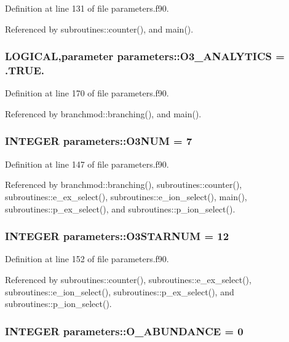Definition at line 131 of file parameters.f90.

Referenced by subroutines::counter(), and main().\hypertarget{namespaceparameters_aba22684f89f881fe4dc9d78bd30d6f5b}{
\subsubsection[{O3\_\-ANALYTICS}]{\setlength{\rightskip}{0pt plus 5cm}LOGICAL,parameter {\bf parameters::O3\_\-ANALYTICS} = .TRUE.}}
\label{namespaceparameters_aba22684f89f881fe4dc9d78bd30d6f5b}


Definition at line 170 of file parameters.f90.

Referenced by branchmod::branching(), and main().\hypertarget{namespaceparameters_a5d2edd19cb37ff34b422b6a5fdcf4358}{
\subsubsection[{O3NUM}]{\setlength{\rightskip}{0pt plus 5cm}INTEGER {\bf parameters::O3NUM} = 7}}
\label{namespaceparameters_a5d2edd19cb37ff34b422b6a5fdcf4358}


Definition at line 147 of file parameters.f90.

Referenced by branchmod::branching(), subroutines::counter(), subroutines::e\_\-ex\_\-select(), subroutines::e\_\-ion\_\-select(), main(), subroutines::p\_\-ex\_\-select(), and subroutines::p\_\-ion\_\-select().\hypertarget{namespaceparameters_a882e51984a7c32da2dc6a56dc6afca79}{
\subsubsection[{O3STARNUM}]{\setlength{\rightskip}{0pt plus 5cm}INTEGER {\bf parameters::O3STARNUM} = 12}}
\label{namespaceparameters_a882e51984a7c32da2dc6a56dc6afca79}


Definition at line 152 of file parameters.f90.

Referenced by subroutines::counter(), subroutines::e\_\-ex\_\-select(), subroutines::e\_\-ion\_\-select(), subroutines::p\_\-ex\_\-select(), and subroutines::p\_\-ion\_\-select().\hypertarget{namespaceparameters_a94daa6cedb27148cbfae307910b4acf0}{
\subsubsection[{O\_\-ABUNDANCE}]{\setlength{\rightskip}{0pt plus 5cm}INTEGER {\bf parameters::O\_\-ABUNDANCE} = 0}}
\label{namespaceparameters_a94daa6cedb27148cbfae307910b4acf0}


